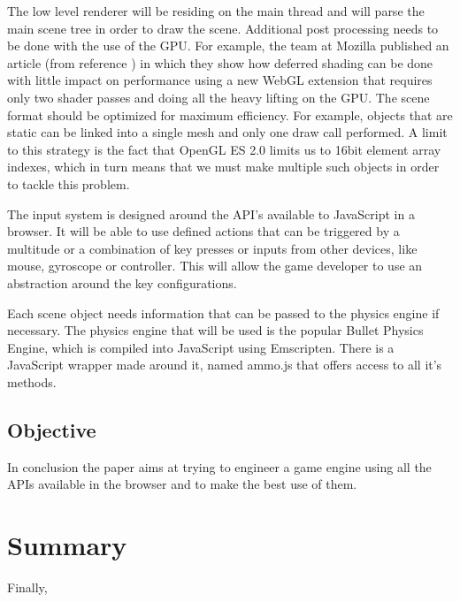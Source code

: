 The low level renderer will be residing on the main thread and will parse the main scene tree in order to draw the scene. Additional post processing needs to be done with the use of the GPU. For example, the team at Mozilla published an article (from reference \cite{tian14}) in which they show how deferred shading can be done with little impact on performance using a new WebGL extension that requires only two shader passes and doing all the heavy lifting on the GPU. The scene format should be optimized for maximum efficiency. For example, objects that are static can be linked into a single mesh and only one draw call performed. A limit to this strategy is the fact that OpenGL ES 2.0 limits us to 16bit element array indexes, which in turn means that we must make multiple such objects in order to tackle this problem.

The input system is designed around the API's available to JavaScript in a browser. It will be able to use defined actions that can be triggered by a multitude or a combination of key presses or inputs from other devices, like mouse, gyroscope or controller. This will allow the game developer to use an abstraction around the key configurations.

Each scene object needs information that can be passed to the physics engine if necessary. The physics engine that will be used is the popular Bullet Physics Engine, which is compiled into JavaScript using Emscripten. There is a JavaScript wrapper made around it, named ammo.js that offers access to all it's methods.
 


\subsection{Objective}
\label{sub-sec:proj-desc-objective}

In conclusion the paper aims at trying to engineer a game engine using all the APIs available in the browser and to make the best use of them.


\section{Summary}
\label{sec:summary}





Finally,  
